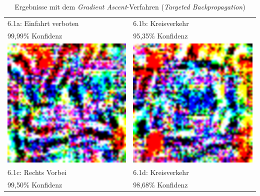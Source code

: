 \begin{table}
\begin{tabular}{p{4.4cm}p{4.4cm}}
	6.1a: Einfahrt verboten & 6.1b: Kreisverkehr \\
	99,99\% Konfidenz&95,35\% Konfidenz\\
	\includegraphics[width=\linewidth]{Images/AnPe/39_RechtsVorbeiOrigLinksvorbei} &\includegraphics[width=\linewidth]{Images/AnPe/40_kreisverkehr}  \\
	6.1c: Rechts Vorbei&6.1d: Kreisverkehr\\
	99,50\% Konfidenz&98,68\% Konfidenz\\
\end{tabular}

\caption{Ergebnisse mit dem \textit{Gradient Ascent}-Verfahren (\textit{Targeted Backpropagation})}
\label{tab:gasc1}
\end{table}

